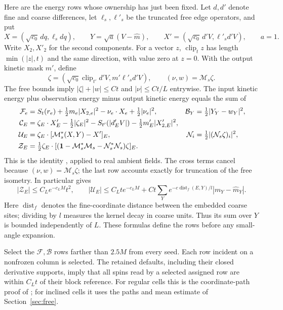 Here are the energy rows whose ownership has just been fixed.  Let
$d,d'$ denote fine and coarse differences, let $\ell_s,\ell'_s$ be the
truncated free edge operators, and put
\[
 X=(\sqrt{c_0}\,dq,\ell_s dq),\qquad
 Y=\sqrt a(V-\widehat m),\qquad
 X'=(\sqrt{c_0}\,d'V,\ell'_s d'V),\qquad a=1.
\]
Write $X_2,X'_2$ for the second components.  For a vector $z$,
$\operatorname{clip}_t z$ has length $\min(|z|,t)$ and the same
direction, with value zero at $z=0$.  With the output kinetic mask $m'$,
define
\[
 \zeta=(\sqrt{c_0}\operatorname{clip}_{t'}d'V,
                         m'\ell'_s d'V),
 \qquad (\nu,w)=\mathcal M_s\zeta.
\]
The free bounds imply
$|\zeta|+|w|\le Ct$ and $|\nu|\le Ct/L$ entrywise.  The input kinetic
energy plus observation energy minus output kinetic energy equals the
sum of
\begin{align*}
 \mathcal F_e&=S_t(r_e)+\tfrac12m_e|X_{2,e}|^2
                      -\nu_e\cdot X_e+\tfrac12|\nu_e|^2,&
 \mathcal B_Y&=\tfrac12|Y_Y-w_Y|^2,\\
 \mathcal C_E&=\zeta_E\cdot X'_E-\tfrac12|\zeta_E|^2
           -S_{t'}(|d'_EV|)-\tfrac12m'_E|X'_{2,E}|^2,\\
 \mathcal U_E&=\zeta_E\cdot[\mathcal M_s^*(X,Y)-X']_E,&
 \mathcal N_i&=\tfrac12| (\mathcal N_s\zeta)_i|^2,\\
 \mathcal Z_E&=\tfrac12\zeta_E\cdot
       [(\mathbf 1-\mathcal M_s^*\mathcal M_s-\mathcal N_s^*\mathcal N_s)
                                                     \zeta]_E.
\end{align*}
This is the identity , applied to real ambient fields.
The cross terms cancel because $(\nu,w)=\mathcal M_s\zeta$; the last
row accounts exactly for truncation of the free isometry.  In
particular  gives
\[
 |\mathcal Z_E|\le C_Le^{-c_LM}t^2,
 \qquad
 |\mathcal U_E|\le C_Lte^{-c_LM}
       +Ct\sum_Ye^{-c\operatorname{dist}_f(E,Y)/l}|m_Y-\widehat m_Y|.
\]
Here $\operatorname{dist}_f$ denotes the fine-coordinate distance
between the embedded coarse sites; dividing by $l$ measures the kernel
decay in coarse units.  Thus its sum over $Y$ is bounded independently
of $L$.  These formulas define the rows before any small-angle
expansion.

Select the $\mathcal F,\mathcal B$ rows farther than $2.5M$ from every
seed.  Each row incident on a nonfrozen column is selected.  The
retained defaults, including their closed derivative supports, imply
that all spins read by a selected assigned row are within $C_Lt$ of
their block reference.  For regular cells this is the coordinate-path
proof of ; for inclined cells it uses the paths
and mean estimate of Section~\ref{sec:free}.

